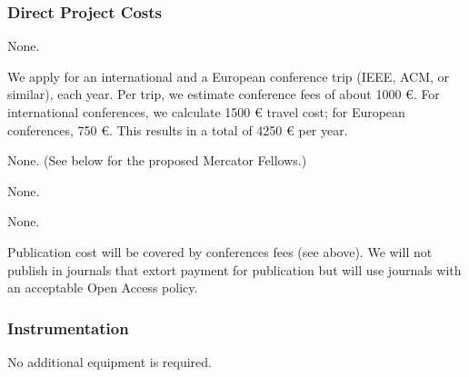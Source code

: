 \subsubsection{Direct Project Costs}
\begin{funds}



None. 


We apply for an international and a European conference trip (IEEE,
ACM, or similar), each year. Per trip, we estimate conference fees of
about 1000 €. For international conferences, we calculate 1500 €
travel cost; for European conferences, 750 €. This results in a total
of 4250 € per year. 



None. (See below for the proposed Mercator Fellows.) 

None.

None.


Publication cost will be covered by conferences fees (see above). We
will not publish in journals that extort payment for publication but
will use journals with an acceptable Open Access policy. 


\end{funds}

\subsubsection{Instrumentation}


No additional equipment is required. 


